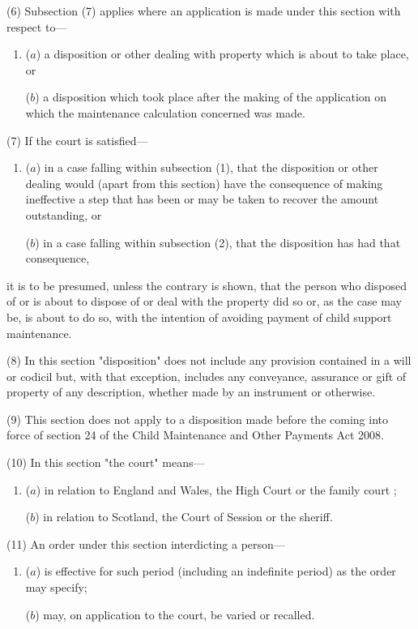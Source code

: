 \documentclass[12pt,a4paper]{article}
\begin{document}
(6)
Subsection (7) applies where an application is made under this section with respect to---
\begin{enumerate}\item[]
($a$) a disposition or other dealing with property which is about to take place, or

($b$) a disposition which took place after the making of the application on which the maintenance calculation concerned was made.
\end{enumerate}

(7) If the court is satisfied---
\begin{enumerate}\item[]
($a$) in a case falling within subsection (1), that the disposition or other dealing would (apart from this section) have the consequence of making ineffective a step that has been or may be taken to recover the amount outstanding, or

($b$) in a case falling within subsection (2), that the disposition has had that consequence,
\end{enumerate}
it is to be presumed, unless the contrary is shown, that the person who disposed of or is about to dispose of or deal with the property did so or, as the case may be, is about to do so, with the intention of avoiding payment of child support maintenance.

(8)
In this section "disposition" does not include any provision contained in a will or codicil but, with that exception, includes any conveyance, assurance or gift of property of any description, whether made by an instrument or otherwise.

(9)
This section does not apply to a disposition made before the coming into force of section 24 of the Child Maintenance and Other Payments Act 2008.

(10)
In this section "the court" means---
\begin{enumerate}\item[]
($a$) in relation to England and Wales, the High Court
or the family court%
;

($b$) in relation to Scotland, the Court of Session or the sheriff.
\end{enumerate}

(11) An order under this section interdicting a person---
\begin{enumerate}\item[]
($a$) is effective for such period (including an indefinite period) as the order may specify;

($b$) may, on application to the court, be varied or recalled.
\end{enumerate}
\end{document}
